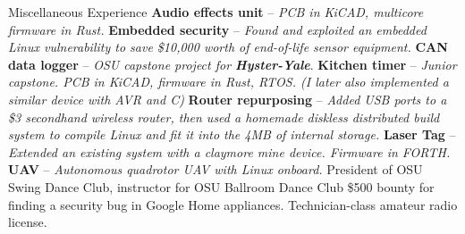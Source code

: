 \begin{rubric}{Miscellaneous Experience}
%
  \entry*[2023] \textbf{Audio effects unit} -- \textit{PCB in KiCAD, multicore firmware in Rust.}
%
  \entry*[2023] \textbf{Embedded security} -- \textit{Found and exploited an embedded Linux vulnerability to save \$10,000 worth of end-of-life sensor equipment.}
%
  \entry*[2022] \textbf{CAN data logger} -- \textit{OSU capstone project for \textbf{Hyster-Yale}}.
%
  \entry*[2022] \textbf{Kitchen timer} -- \textit{Junior capstone. PCB in KiCAD, firmware in Rust, RTOS. \hfill\break (I later also implemented a similar device with AVR and C)}
%
  \entry*[2019] \textbf{Router repurposing} -- \textit{Added USB ports to a \$3 secondhand wireless router, then used a homemade diskless distributed build system to compile Linux and fit it into the 4MB of internal storage.}
%
  \entry*[$\cdots\cdot$] \textbf{Laser Tag} -- \textit{Extended an existing system with a claymore mine device. Firmware in FORTH.}
%
  \entry*[$\cdots\cdot$] \textbf{UAV} -- \textit{Autonomous quadrotor UAV with Linux onboard.}
\entry*[2020 -- 2023] President of OSU Swing Dance Club, instructor for OSU Ballroom Dance Club
\entry*[2020] \$500 bounty for finding a security bug in Google Home appliances.
\entry*[] Technician-class amateur radio license.

\end{rubric}
